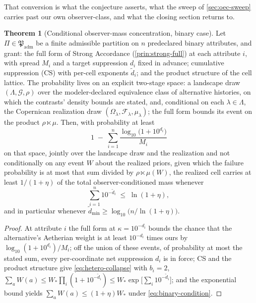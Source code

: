 \documentclass[11pt]{article}
\theoremstyle{definition}
\newtheorem{theorem}{Theorem}
\begin{document}
That conversion is what the conjecture asserts, what the sweep of \autoref{sec:oec-sweep} carries past our own observer-class, and what the closing section returns to.

\begin{theorem}[Conditional observer-mass concentration, binary case]
\label{thm:concentration}
Let $\Pi \in \mathfrak{P}_{\mathrm{adm}}$ be a finite admissible partition on $n$ predeclared binary attributes, and grant: the full form of Strong Accordance (\autoref{prin:strong-full}) at each attribute $i$, with spread $M_i$ and a target suppression $d_i$ fixed in advance; cumulative suppression (CS) with per-cell exponents $\tilde d_i$; and the product structure of the cell lattice. The probability lives on an explicit two-stage space: a landscape draw $(\Lambda, \mathcal{G}, \rho)$ over the modeler-declared equivalence class of alternative histories, on which the contrasts' density bounds are stated, and, conditional on each $\lambda \in \Lambda$, the Copernican realization draw $(\Omega_\lambda, \mathcal{F}_\lambda, \mu_\lambda)$; the full form bounds its event on the product $\rho \ltimes \mu$. Then, with probability at least
\[ 1 \;-\; \sum_{i=1}^{n} \frac{\log_{10}\big(1 + 10^{d_i}\big)}{M_i} \]
on that space, jointly over the landscape draw and the realization and not conditionally on any event $W$ about the realized priors, given which the failure probability is at most that sum divided by $\rho\ltimes\mu(W)$, the realized cell carries at least $1/(1+\eta)$ of the total observer-conditioned mass whenever
\begin{equation}
\label{eq:binary-condition}
\sum_{i=1}^{n} 10^{-\tilde d_i} \;\le\; \ln(1+\eta),
\end{equation}
and in particular whenever $\tilde d_{\min} \ge \log_{10}\big(n/\ln(1+\eta)\big)$.
\end{theorem}
\begin{proof}
At attribute $i$ the full form at $\kappa = 10^{-d_i}$ bounds the chance that the alternative's Aetherian weight is at least $10^{-d_i}$ times ours by $\log_{10}(1 + 10^{d_i})/M_i$; off the union of these events, of probability at most the stated sum, every per-coordinate net suppression $d_i$ is in force; CS and the product structure give \eqref{eq:hetero-collapse} with $b_i = 2$, $\sum_a W(a) \le W_\ast \prod_i (1 + 10^{-\tilde d_i}) \le W_\ast \exp\big[\sum_i 10^{-\tilde d_i}\big]$; and the exponential bound yields $\sum_a W(a) \le (1+\eta) W_\ast$ under \eqref{eq:binary-condition}.
\end{proof}
\end{document}

